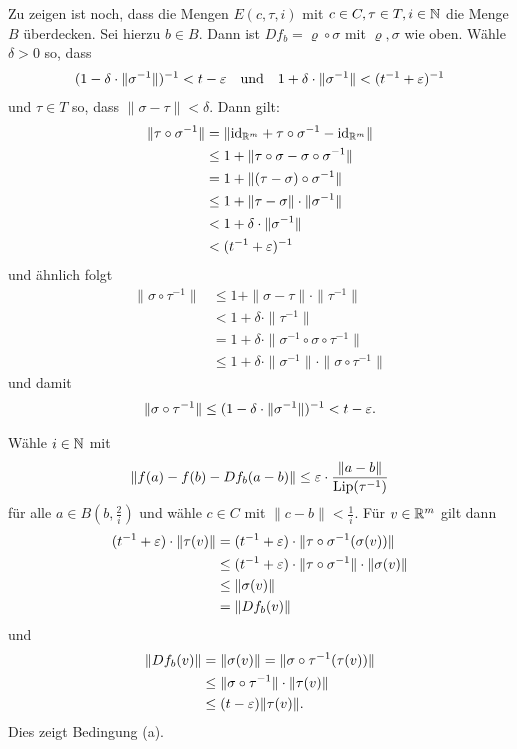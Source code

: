 \documentclass[a4paper,twoside,DIV15,BCOR12mm]{scrbook}
\newcommand{\id}{\mathrm{id}}
\DeclareMathOperator{\Lip}{Lip}
\begin{document}
\begin{beweis}
Zu zeigen ist noch, dass die Mengen $E(c,\tau,i)$ mit $c\in C, \tau\in T,i\in \mathbb{N}$ die Menge $B$ überdecken. Sei hierzu $b\in B$. Dann ist $Df_b = \varrho \circ \sigma$ mit $\varrho, \sigma$ wie oben. Wähle $\delta>0$ so, dass
\begin{align*}
(1-\delta\cdot\|\sigma^{-1}\|)^{-1} < t - \varepsilon \quad\text{und} \quad 1+\delta\cdot\|\sigma^{-1}\| < (t^{-1}+\varepsilon)^{-1}
\end{align*}
und $\tau\in T$ so, dass $\|\sigma-\tau\|< \delta$. Dann gilt:
\begin{align*}
\|\tau\circ\sigma^{-1}\| 
&= \|\id_{\MdR^m}+\tau \circ \sigma^{-1} - \id_{\MdR^m} \|\\
&\le 1 + \| \tau \circ \sigma - \sigma\circ \sigma^{-1}\| \\
&=   1 + \|(\tau -\sigma)\circ \sigma^{-1}\| \\
&\le 1 + \|\tau -\sigma\|\cdot\|\sigma^{-1}\| \\
&<  1+\delta\cdot\|\sigma^{-1}\| \\
&< (t^{-1}+\ep)^{-1}
\end{align*}
und ähnlich folgt
\begin{align*}
\|\sigma\circ\tau^{-1}\| &\le 1 + \|\sigma - \tau\| \cdot \|\tau^{-1}\| \\
&< 1 + \delta\cdot\|\tau^{-1}\| \\
&= 1+\delta\cdot\|\sigma^{-1} \circ \sigma\circ\tau^{-1}\| \\
&\le 1 + \delta\cdot\|\sigma^{-1}\|\cdot \|\sigma\circ\tau^{-1}\| 
\end{align*}
und damit
\begin{align*}
\|\sigma\circ\tau^{-1}\| \le (1-\delta\cdot\|\sigma^{-1}\|)^{-1} < t-\varepsilon.
\end{align*}

Wähle $i\in\mathbb{N}$ mit
\begin{align*}
\|f(a)-f(b) - Df_b(a-b)\| \le \ep \cdot \frac{\|a-b\|}{\Lip(\tau^{-1})}
\end{align*}
für alle $a\in B(b,\frac2i)$ und wähle $c\in C$ mit $\|c-b\| < \frac1i$. Für $v\in\mathbb{R}^m$ gilt dann
\begin{align*}
(t^{-1} + \varepsilon)\cdot \|\tau(v)\| 
&= (t^{-1} + \varepsilon)\cdot \|\tau\circ\sigma^{-1}(\sigma(v))\| \\
&\le (t^{-1} + \varepsilon)\cdot \|\tau\circ\sigma^{-1}\| \cdot \|\sigma(v)\| \\
&\le \|\sigma(v)\| \\
&= \|Df_b(v)\|
\end{align*}
und
\begin{align*}
\|Df_b(v)\| &= \|\sigma(v)\| = \|\sigma\circ\tau^{-1}(\tau(v))\| \\
&\le \|\sigma\circ\tau^{-1}\| \cdot \|\tau(v)\| \\
&\le (t-\varepsilon)\|\tau(v)\|.
\end{align*}
Dies zeigt Bedingung (a).


\end{beweis}
\end{document}
